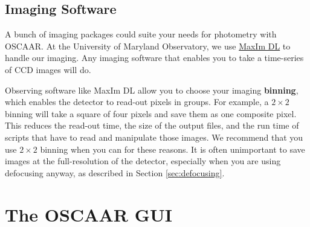 \documentclass[a4paper]{article}
\begin{document}


\subsection{Imaging Software}
A bunch of imaging packages could suite your needs for photometry with OSCAAR. At the University of Maryland Observatory, we use \href{http://www.cyanogen.com/maxim_main.php}{MaxIm DL} to handle our imaging. Any imaging software that enables you to take a time-series of CCD images will do. 

Observing software like MaxIm DL allow you to choose your imaging \textbf{binning}, which enables the detector to read-out pixels in groups. For example, a $2\times2$ binning will take a square of four pixels and save them as one composite pixel. This reduces the read-out time, the size of the output files, and the run time of scripts that have to read and manipulate those images. We recommend that you use $2\times2$ binning when you can for these reasons. It is often unimportant to save images at the full-resolution of the detector, especially when you are using defocusing anyway, as described in Section \ref{sec:defocusing}. 

\section{The OSCAAR GUI} \label{sec:run}
\end{document}
